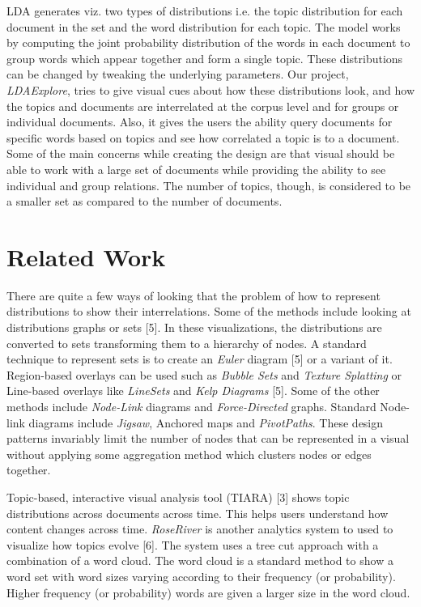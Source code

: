 \documentclass[10pt,journal,compsoc]{IEEEtran}
\begin{document}
LDA generates viz. two types of distributions i.e. the topic distribution for each document in the set and the word distribution for each topic. The model works by computing the joint probability distribution of the words in each document to group words which appear together and form a single topic. These distributions can be changed by tweaking the underlying parameters. Our project, \textit{LDAExplore}, tries to give visual cues about how these distributions look, and how the topics and documents are interrelated at the corpus level and for groups or individual documents. Also, it gives the users the ability query documents for specific words based on topics and see how correlated a topic is to a document. Some of the main concerns while creating the design are that visual should be able to work with a large set of documents while providing the ability to see individual and group relations. The number of topics, though, is considered to be a smaller set as compared to the number of documents.

\section{Related Work}
\label{sec:RelatedWork}
There are quite a few ways of looking that the problem of how to represent distributions to show their interrelations. Some of the methods include looking at distributions graphs or sets [5]. In these visualizations, the distributions are converted to sets transforming them to a hierarchy of nodes. A standard technique to represent sets is to create an \textit{Euler} diagram [5] or a variant of it. Region-based overlays can be used such as \textit{Bubble Sets} and \textit{Texture Splatting} or Line-based overlays like \textit{LineSets} and \textit{Kelp Diagrams} [5]. Some of the other methods include \textit{Node-Link} diagrams and \textit{Force-Directed} graphs. Standard Node-link diagrams include \textit{Jigsaw}, Anchored maps and \textit{PivotPaths}. These design patterns invariably limit the number of nodes that can be represented in a visual without applying some aggregation method which clusters nodes or edges together.

Topic-based, interactive visual analysis tool (TIARA) [3] shows topic distributions across documents across time. This helps users understand how content changes across time. \textit{RoseRiver} is another analytics system to used to visualize how topics evolve [6]. The system uses a tree cut approach with a combination of a word cloud. The word cloud is a standard method to show a word set with word sizes varying according to their frequency (or probability). Higher frequency (or probability) words are given a larger size in the word cloud.
\end{document}
